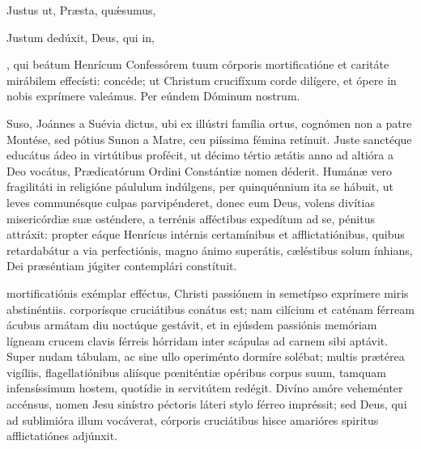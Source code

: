 \documentclass[fontsize=9pt,paper=A6,twoside,BCOR=1mm,DIV=22,headinclude]{scrarticle}
\begin{document}
\begin{multicols}{2}
\V Justus ut,  Præsta, qu\'æsumus, 


\AiiiC 

\V Justum dedúxit,  Deus, qui in, 





\VRCi 

\MiC 

, qui beátum Henrícum Confessórem tuum córporis mortificatióne et caritáte mirábilem effecísti: concéde; ut Christum crucifíxum corde dilígere, et ópere in nobis exprímere valeámus. Per eúndem Dóminum nostrum.


{

 Suso, Joánnes a Suévia dictus, ubi ex illústri família ortus, cognómen non a patre Montése, sed pótius Sunon a Matre, ceu piíssima fémina retínuit. Juste sanctéque educátus ádeo in virtútibus profécit, ut décimo tértio ætátis anno ad altióra a Deo vocátus, Prædicatórum Ordini Constántiæ nomen déderit. Humánæ vero fragilitáti in religióne páululum indúlgens, per quinquénnium ita se hábuit, ut leves communésque culpas parvipénderet, donec eum Deus, volens divítias misericórdiæ suæ osténdere, a terrénis afféctibus expedítum ad se, pénitus attráxit: propter eáque Henrícus intérnis certamínibus et afflictatiónibus, quibus retardabátur a via perfectiónis, magno ánimo superátis, cæléstibus solum ínhians, Dei præséntiam júgiter contemplári constítuit.

}

{
\RVCiv 

 mortificatiónis exémplar efféctus, Christi passiónem in semetípso exprímere miris abstinéntiis. corporísque cruciátibus conátus est; nam cilícium et caténam férream ácubus armátam diu noctúque gestávit, et in ejúsdem passiónis memóriam lígneam crucem clavis férreis hórridam inter scápulas ad carnem sibi aptávit. Super nudam tábulam, ac sine ullo operiménto dormíre solébat; multis prætérea vigíliis, flagellatiónibus aliísque pœniténtiæ opéribus corpus suum, tamquam infensíssimum hostem, quotídie in servitútem redégit. Divíno amóre veheménter accénsus, nomen Jesu sinístro péctoris láteri stylo férreo impréssit; sed Deus, qui ad sublimióra illum vocáverat, córporis cruciátibus hisce amarióres spiritus afflictatiónes adjúnxit.

}
\end{multicols}
\end{document}
